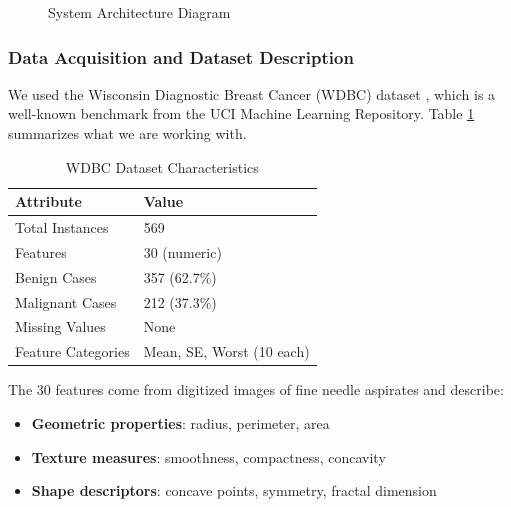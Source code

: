 \documentclass[12pt]{article}
\begin{document}
\begin{figure}[H]
{%
}
\caption{System Architecture Diagram}
\label{fig:architecture}
\end{figure}

\subsubsection{Data Acquisition and Dataset Description}

We used the Wisconsin Diagnostic Breast Cancer (WDBC) dataset \cite{wolberg1995}, which is a well-known benchmark from the UCI Machine Learning Repository. Table \ref{tab:dataset} summarizes what we are working with.

\begin{table}[H]
\centering
\caption{WDBC Dataset Characteristics}
\label{tab:dataset}
\begin{tabular}{|l|l|}
\hline
\textbf{Attribute} & \textbf{Value} \\ \hline
Total Instances & 569 \\ \hline
Features & 30 (numeric) \\ \hline
Benign Cases & 357 (62.7\%) \\ \hline
Malignant Cases & 212 (37.3\%) \\ \hline
Missing Values & None \\ \hline
Feature Categories & Mean, SE, Worst (10 each) \\ \hline
\end{tabular}
\end{table}

The 30 features come from digitized images of fine needle aspirates and describe:
\begin{itemize}
    \item \textbf{Geometric properties}: radius, perimeter, area
    \item \textbf{Texture measures}: smoothness, compactness, concavity
    \item \textbf{Shape descriptors}: concave points, symmetry, fractal dimension
\end{itemize}
\end{document}
